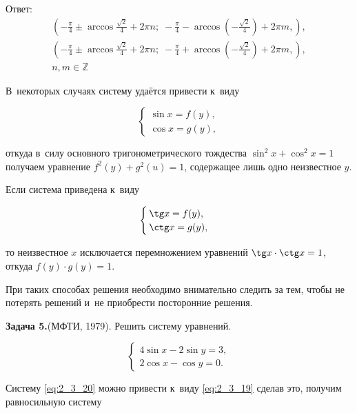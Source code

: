 Ответ:
\begin{align*}
\displaystyle \left( 
-\frac{\pi}{4} \pm \arccos \frac{\sqrt{2}}{4} + 2\pi n; \;
-\frac{\pi}{4} - \arccos \left(-\frac{\sqrt{2}}{4}\right) + 2\pi m,
\right), \\
\displaystyle \left( 
-\frac{\pi}{4} \pm \arccos \frac{\sqrt{2}}{4} + 2\pi n; \;
-\frac{\pi}{4} + \arccos \left(-\frac{\sqrt{2}}{4}\right) + 2\pi m,
\right), \\
n, m \in \mathbb{Z}
\end{align*}

В~некоторых случаях систему удаётся привести к~виду

\begin{equation}\label{eq:2_3_19}
\begin{cases}
\sin x = f(y), \\
\cos x = g(y),
\end{cases}
\end{equation}

\noindent
откуда в~силу основного тригонометрического тождества
$\sin^{2} x + \cos^{2} x = 1$ получаем уравнение
$f^{2}(y) + g^{2}(u) = 1$, содержащее лишь одно неизвестное $y$.

Если система приведена к~виду

\begin{equation*}
\begin{cases}
\tg x = f(y), \\
\ctg x = g(y),
\end{cases}
\end{equation*}

\noindent
то неизвестное $x$ исключается перемножением уравнений
$\tg x \cdot \ctg x = 1$, откуда $f(y) \cdot g(y) = 1$.

При таких способах решения необходимо внимательно следить за тем,
чтобы не потерять решений и~не приобрести посторонние решения.

\textbf{Задача 5.}\label{ex:2_3_5}(МФТИ, 1979). Решить систему уравнений.

\begin{equation}\label{eq:2_3_20}
\begin{cases}
4 \sin x - 2 \sin y = 3, \\
2 \cos x - \cos y = 0.
\end{cases}
\end{equation}

Систему \eqref{eq:2_3_20} можно привести к~виду \eqref{eq:2_3_19}
сделав это, получим равносильную систему

